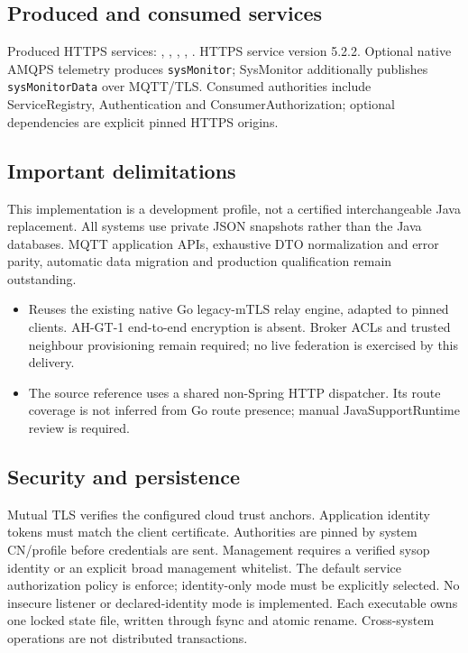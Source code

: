 \documentclass[a4paper]{arrowhead}
\begin{document}
\subsection{Produced and consumed services}
Produced HTTPS services: , \allowbreak {}, \allowbreak {}, \allowbreak {}, \allowbreak {}.
HTTPS service version 5.2.2. Optional native AMQPS telemetry produces \texttt{sysMonitor}; SysMonitor additionally publishes \texttt{sysMonitorData} over MQTT/TLS. Consumed authorities include ServiceRegistry, Authentication and ConsumerAuthorization; optional dependencies are explicit pinned HTTPS origins.
\subsection{Important delimitations}
This implementation is a development profile, not a certified interchangeable Java replacement. All systems use private JSON snapshots rather than the Java databases. MQTT application APIs, exhaustive DTO normalization and error parity, automatic data migration and production qualification remain outstanding.
\begin{itemize}
\item Reuses the existing native Go legacy-mTLS relay engine, adapted to pinned clients. AH-GT-1 end-to-end encryption is absent. Broker ACLs and trusted neighbour provisioning remain required; no live federation is exercised by this delivery.
\item The source reference uses a shared non-Spring HTTP dispatcher. Its route coverage is not inferred from Go route presence; manual JavaSupportRuntime review is required.
\end{itemize}
\subsection{Security and persistence}
Mutual TLS verifies the configured cloud trust anchors. Application identity tokens must match the client certificate. Authorities are pinned by system CN/profile before credentials are sent. Management requires a verified sysop identity or an explicit broad management whitelist. The default service authorization policy is enforce; identity-only mode must be explicitly selected. No insecure listener or declared-identity mode is implemented. Each executable owns one locked state file, written through fsync and atomic rename. Cross-system operations are not distributed transactions.
\clearpage
\end{document}
